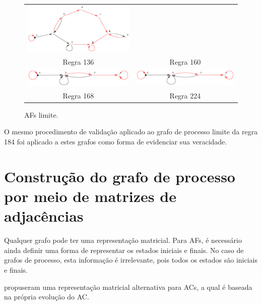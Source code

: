 \documentclass[12pt,a4paper]{article}
\begin{document}
\begin{figure}[H]
\begin{tabular}{c c}
\includegraphics[scale=0.7]{img/limit160} \\
Regra 136 & Regra 160 \\
\includegraphics[scale=0.7]{img/limit168} &
\includegraphics[scale=0.7]{img/limit224} \\
Regra 168 & Regra 224 \\
\end{tabular}
\caption{AFs limite.}
\label{fig:limits}
\end{figure}

O mesmo procedimento de validação aplicado ao grafo de processo limite da
regra 184 foi aplicado a estes grafos como forma de evidenciar sua
veracidade.

\newpage

\section{Construção do grafo de processo por meio de matrizes de
adjacências}\label{sec:matrix}

Qualquer grafo pode ter uma representação matricial. Para AFs, é necessário
ainda definir uma forma de representar os estados iniciais e finais. No
caso de grafos de processo, esta informação é irrelevante, pois todos
os estados são iniciais e finais.

 propuseram uma representação matricial alternativa para
ACs, a qual é baseada na própria evolução do AC.
\end{document}
